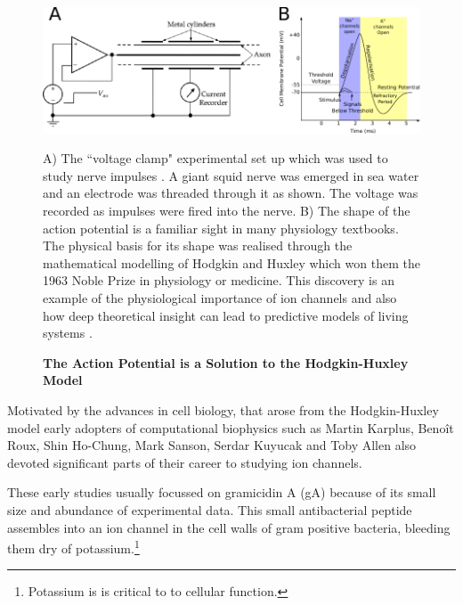 \begin{figure}
	\begin{center}
		\includegraphics[width=\textwidth]{figures/Hodgkin-Huxley_action_potential.pdf}
	\end{center}
	\captionsetup{singlelinecheck = false, justification=raggedright}
	\caption[The Action Potential is a Solution to the Hodkin-Huxley Model] {\textbf{The Action Potential is a Solution to the Hodgkin-Huxley Model }}{ A) The ``voltage clamp" experimental set up which was used to study nerve impulses \cite{zotero-3607}. A giant squid nerve was emerged in sea water and an electrode was threaded through it as shown. The voltage was recorded as impulses were fired into the nerve. B) The shape of the action potential is a familiar sight in many physiology textbooks. The physical basis for its shape was realised through the mathematical modelling of Hodgkin and Huxley which won them the 1963 Noble Prize in physiology or medicine. This discovery is an example of the physiological importance of ion channels and also how deep theoretical insight can lead to predictive models of living systems \cite{hodgkin1952, hodgkin1952a, hodgkin1952b, hodgkin1952c, hodgkin1952d}.}
	\label{action_potential_graphic}
\end{figure}

Motivated by the advances in cell biology, that arose from the Hodgkin-Huxley model early adopters of computational biophysics such as Martin Karplus, Beno\^it Roux, Shin Ho-Chung, Mark Sanson, Serdar Kuyucak and Toby Allen also devoted significant parts of their career to studying ion channels\cite{sansom1991, roux1991, roux1993, sansom1991, allen2003, allen2004, chung2002, tieleman2001}. 

These early studies usually focussed on gramicidin A (gA) because of its small size and abundance of experimental data. This small antibacterial peptide assembles into an ion channel in the cell walls of gram positive bacteria\cite{liou2015}, bleeding them dry of potassium.\footnote{Potassium is is critical to to cellular function.}

